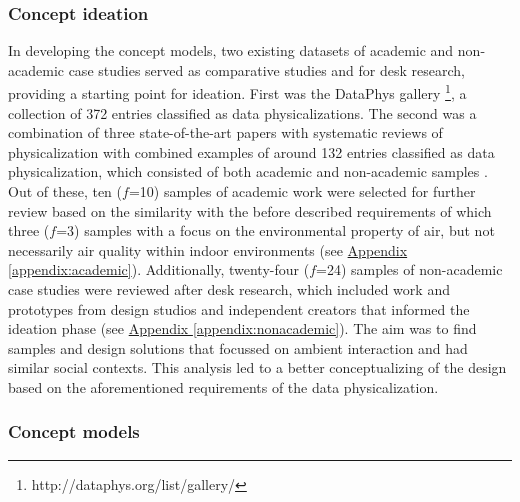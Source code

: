 \subsubsection{Concept ideation}
In developing the concept models, two existing datasets of academic and non-academic case studies served as comparative studies and for desk research, providing a starting point for ideation. First was the DataPhys gallery \footnote{http://dataphys.org/list/gallery/}, a collection of 372 entries classified as data physicalizations. The second was a combination of three state-of-the-art papers with systematic reviews of physicalization with combined examples of around 132 entries classified as data physicalization, which consisted of both academic and non-academic samples \cite{sauve_physecology_2022, anhalt_university_germany_design_2022, ranasinghe_encoding_2023}. Out of these, ten ($f$=10) samples of academic work were selected for further review based on the similarity with the before described requirements of which three ($f$=3) samples with a focus on the environmental property of air, but not necessarily air quality within indoor environments (see \hyperref[appendix:academic]{Appendix \ref*{appendix:academic}}). Additionally, twenty-four ($f$=24) samples of non-academic case studies were reviewed after desk research, which included work and prototypes from design studios and independent creators that informed the ideation phase (see \hyperref[appendix:nonacademic]{Appendix \ref*{appendix:nonacademic}}). The aim was to find samples and design solutions that focussed on ambient interaction and had similar social contexts. This analysis led to a better conceptualizing of the design based on the aforementioned requirements of the data physicalization. 

\subsubsection{Concept models}


